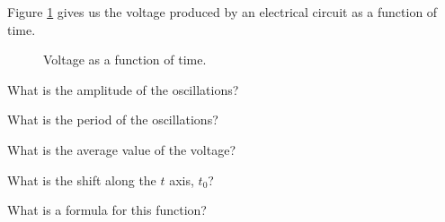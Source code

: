 \begin{activity}\label{A:0.5.1}
    Figure \ref{fig:0.5.A1} gives us the voltage produced by an electrical circuit as a function of time.
    \begin{figure}[ht!]
    \begin{center}
    \end{center}
    \caption{Voltage as a function of time.}
    \label{fig:0.5.A1}
\end{figure}


\ba
\item What is the amplitude of the oscillations?  %
\item What is the period of the oscillations? %
\item What is the average value of the voltage?  %
\item What is the shift along the $t$ axis, $t_0$?  %
\item What is a formula for this function?  %
\ea

\end{activity}\aftera
